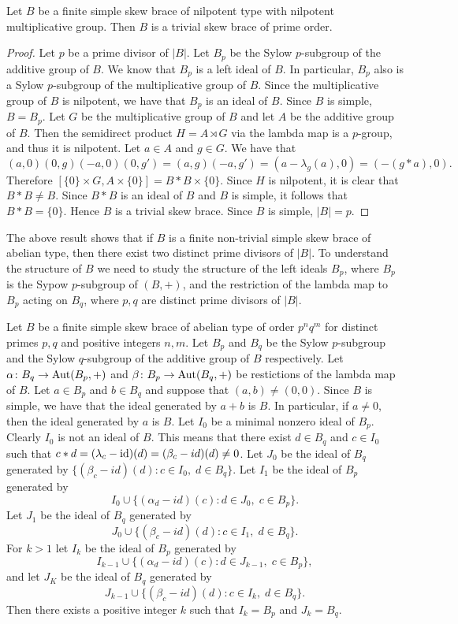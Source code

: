 \begin{lemma}
    \label{lem:nilpotentsimple}
    Let $B$ be a finite simple skew brace of nilpotent type with nilpotent multiplicative group. Then $B$ is a trivial skew brace of prime order. 
\end{lemma}

\begin{proof}
    Let $p$ be a prime divisor of $|B|$. Let $B_p$ be the Sylow $p$-subgroup of the additive group of $B$. We know that $B_p$ is a left ideal of $B$. In particular, $B_p$ also is a Sylow $p$-subgroup of the multiplicative group of $B$. Since the multiplicative group of $B$ is nilpotent, we have that $B_p$ is an ideal of $B$. Since $B$ is simple, $B=B_p$. Let $G$ be the multiplicative group of $B$ and let $A$ be the additive group of $B$. Then the semidirect product $H=A\rtimes G$ via the lambda map is a $p$-group, and thus it is nilpotent. Let $a\in A$ and $g\in G$. We have that 
    $$(a,0)(0,g)(-a,0)(0,g')=(a,g)(-a,g')=(a-\lambda_g(a),0)=(-(g*a),0).$$
    Therefore $[\{0\}\times G,A\times\{0\}]=B*B\times \{0\}$. Since $H$ is nilpotent, it is clear that $B*B\neq B$. Since $B*B$ is an ideal of $B$ and $B$ is simple, it follows that $B*B=\{0\}$. Hence $B$ is a trivial skew brace. Since $B$ is simple, $|B|=p$.   
\end{proof}

The above result shows that if $B$ is a finite non-trivial simple skew brace of abelian type, 
then there exist two distinct prime divisors of $|B|$. To understand the structure of $B$ we need to study the structure of the left ideals $B_p$, where $B_p$ is the Sypow $p$-subgroup of $(B,+)$, and the restriction of the lambda map to $B_p$ acting on $B_q$, where $p,q$ are distinct prime divisors of $|B|$.


Let $B$ be a finite simple skew brace of abelian type of order $p^nq^m$ for distinct primes $p,q$ and positive integers $n,m$. Let $B_p$ and $B_q$ be the Sylow $p$-subgroup and the Sylow $q$-subgroup of the additive group of $B$ respectively. Let $\alpha\colon B_q\rightarrow \operatorname{Aut}(B_p,+)$ and $\beta\colon B_p\rightarrow \operatorname{Aut}(B_q,+)$ be restictions of the lambda map of $B$. Let $a\in B_p$ and $b\in B_q$ and suppose that $(a,b)\neq (0,0)$. Since $B$ is simple, we have that the ideal generated by $a+b$ is $B$. In particular,  if $a\neq 0$, then the ideal generated by $a$ is $B$. Let $I_0$ be a minimal nonzero ideal of $B_p$. Clearly $I_0$ is not an ideal of $B$. This means that there exist $d\in B_q$ and $c\in I_0$ such that $c*d=(\lambda_c-\operatorname{id})(d)=(\beta_c-id)(d)\neq 0$. Let 
$J_0$ be the ideal of $B_q$ generated by $\{ (\beta_c-id)(d) : c\in I_0, \; d\in B_q\}$. Let $I_1$ be the ideal of $B_p$ generated by 
$$I_0\cup \{(\alpha_d-id)(c) : d\in J_0,\; c\in B_p\}.$$ 
Let $J_1$ be the ideal of $B_q$ generated by 
$$J_0\cup \{(\beta_c-id)(d) : c\in I_1,\; d\in B_q\}.$$
For $k>1$ let  $I_k$ be the ideal of $B_p$ generated by 
$$I_{k-1}\cup \{(\alpha_d-id)(c) : d\in J_{k-1},\; c\in B_p\},$$ and let $J_K$ be the ideal of $B_q$ generated by 
$$J_{k-1}\cup \{(\beta_c-id)(d) : c\in I_k,\; d\in B_q\}.$$
Then there exists a positive integer $k$ such that $I_k=B_p$ and $J_k=B_q$. 

